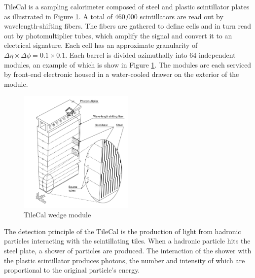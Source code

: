 TileCal is a sampling calorimeter composed of steel and plastic scintillator plates as illustrated in Figure \ref{fig:tileCal}. A total of 460,000 scintillators are read out by wavelength-shifting fibers. The fibers are gathered to define cells and in turn read out by photomultiplier tubes, which amplify the signal and convert it to an electrical signature. Each cell has an approximate granularity of $\Delta\eta \times \Delta\phi = 0.1 \times 0.1$. Each barrel is divided azimuthally into 64 independent modules, an example of which is show in Figure \ref{fig:tileCal}. The modules are each serviced by front-end electronic housed in a water-cooled drawer on the exterior of the module. \\

\begin{figure}
        \centering
	\includegraphics[width=0.5\textwidth]{figures/ch3/tileWedge.png}
	\caption{TileCal wedge module \cite{tile_tdr} }
	\label{fig:tileCal}
\end{figure}

The detection principle of the TileCal is the production of light from hadronic particles interacting with the scintillating tiles. When a hadronic particle hits the steel plate, a shower of particles are produced. The interaction of the shower with the plastic scintillator produces photons, the number and intensity of which are proportional to the original particle's energy. \\


